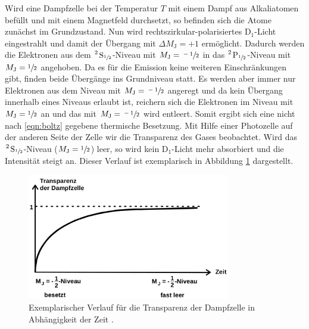 Wird eine Dampfzelle bei der Temperatur $T$ mit einem Dampf aus Alkaliatomen befüllt und 
mit einem Magnetfeld durchsetzt, so befinden sich die Atome zunächst im Grundzustand. Nun wird rechtszirkular-polarisiertes
$\text{D}_1$-Licht eingestrahlt und damit der Übergang mit $\Delta M_\text{J} = +1$ ermöglicht. 
Dadurch werden die Elektronen aus dem $\ce{^2 S_{\sfrac{1}{2}}}$-Niveau mit $M_\text{J}=\sfrac{-1}{2}$ in das 
$\ce{^2 P_{\sfrac{1}{2}}}$-Niveau mit $M_\text{J}=\sfrac{1}{2}$ angehoben. Da es für die Emission
keine weiteren Einschränkungen gibt, finden beide Übergänge ins Grundniveau statt. Es werden aber immer nur
Elektronen aus dem Niveau mit $M_\text{J}=\sfrac{-1}{2}$ angeregt und da kein Übergang innerhalb eines 
Niveaus erlaubt ist, reichern sich die Elektronen im Niveau mit
$M_\text{J}=\sfrac{1}{2}$ an und das mit $M_\text{J}=\sfrac{-1}{2}$ wird entleert. Somit ergibt sich eine 
nicht nach \eqref{eqn:boltz} gegebene thermische Besetzung. 
Mit Hilfe einer Photozelle auf der anderen Seite der Zelle wir die Transparenz des Gases beobachtet.
Wird das $\ce{^2 S_{\sfrac{1}{2}}}$-Niveau ($M_\text{J}=\sfrac{1}{2}$) leer, so wird kein $\text{D}_1$-Licht
mehr absorbiert und die Intensität steigt an. Dieser Verlauf ist exemplarisch in Abbildung \ref{fig:intensität}
dargestellt.
\begin{figure}
  \centering
  \includegraphics[height=5.5cm]{content/pictures/Transparenz.png}
  \caption{Exemplarischer Verlauf für die Transparenz der Dampfzelle in Abhängigkeit der Zeit \cite{anleitung}.}
  \label{fig:intensität}
\end{figure}

